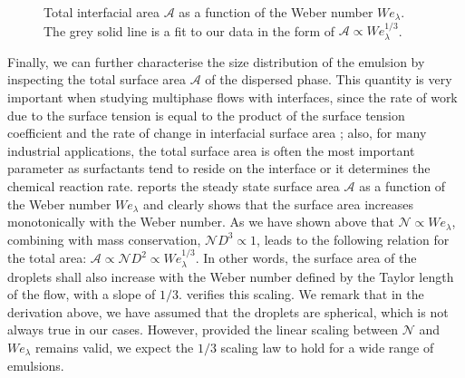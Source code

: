\begin{figure}
	\centering
	 \vspace{0.5cm}
	\caption{Total interfacial area $\mathcal{A}$ as a function of the Weber number $We_\lambda$. The grey solid line is a fit to our data in the form of $\mathcal{A} \propto We_\lambda^{1/3}$.}
	\label{fig:surf}
\end{figure}
Finally, we can further characterise the size distribution of the emulsion by inspecting the total surface area $\mathcal{A}$ of the dispersed phase. This quantity is very important when studying multiphase flows with interfaces, since the rate of work due to the surface tension is equal to the product of the surface tension coefficient and the rate of change in interfacial surface area \citep{dodd_ferrante_2016a}; also, for many industrial applications, the total surface area is often the most important parameter as surfactants tend to reside on the interface or it determines the chemical reaction rate.  reports the steady state surface area $\mathcal{A}$ as a function of the Weber number $We_\lambda$ and clearly shows that the surface area increases monotonically with the Weber number. As we have shown above that $\mathcal{N} \propto We_\lambda$, combining with mass conservation, \ie $\mathcal{N} D^3 \propto 1$, leads to the following relation for the total area: $\mathcal{A} \propto \mathcal{N} D^2 \propto We_\lambda^{1/3}$. In other words, the surface area of the droplets shall also increase with the Weber number defined by the Taylor length of the flow, with a slope of $1/3$.  verifies this scaling. We remark that in the derivation above, we have assumed that the droplets are spherical, which is not always true in our cases. However, provided the linear scaling between $\mathcal{N}$ and $We_\lambda$ remains valid, we expect the $1/3$ scaling law to hold for a wide range of emulsions.

